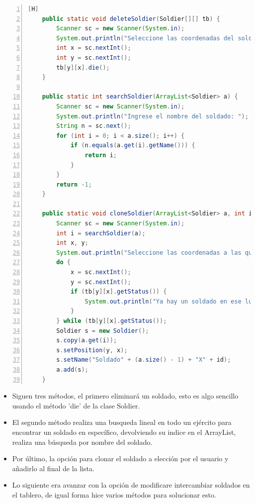 \documentclass{article}
\begin{document}
	\begin{lstlisting}[language=java,caption={Más métodos}, numbers=left][H]
	public static void deleteSoldier(Soldier[][] tb) {
        Scanner sc = new Scanner(System.in);
        System.out.println("Seleccione las coordenadas del soldado a eliminar (x, y)");
        int x = sc.nextInt();
        int y = sc.nextInt();
        tb[y][x].die();
    }

    public static int searchSoldier(ArrayList<Soldier> a) {
        Scanner sc = new Scanner(System.in);
        System.out.println("Ingrese el nombre del soldado: ");
        String n = sc.next();
        for (int i = 0; i < a.size(); i++) {
            if (n.equals(a.get(i).getName())) {
                return i;
            }
        }
        return -1;
    }

    public static void cloneSoldier(ArrayList<Soldier> a, int id, Soldier[][] tb) {
        Scanner sc = new Scanner(System.in);
        int i = searchSoldier(a);
        int x, y;
        System.out.println("Seleccione las coordenadas a las que se desplegara la copia (x, y): ");
        do {
            x = sc.nextInt();
            y = sc.nextInt();
            if (tb[y][x].getStatus()) {
                System.out.println("Ya hay un soldado en ese lugar!");
            }
        } while (tb[y][x].getStatus());
        Soldier s = new Soldier();
        s.copy(a.get(i));
        s.setPosition(y, x);
        s.setName("Soldado" + (a.size() - 1) + "X" + id);
        a.add(s);
    }
	\end{lstlisting}
	
	\begin{itemize}	
		\item Siguen tres métodos, el primero eliminará un soldado, esto es algo sencillo usando el método 'die' de la clase Soldier.
		\item El segundo método realiza una busqueda lineal en todo un ejército para encontrar un soldado en específico, devolviendo su indice en el ArrayList, realiza una búsqueda por nombre del soldado.
		\item Por último, la opción para clonar el soldado a elección por el usuario y añadirlo al final de la lista.
		\item Lo siguiente era avanzar con la opción de modificare intercambiar soldados en el tablero, de igual forma hice varios métodos para solucionar esto.
	\end{itemize}
	
\end{document}
